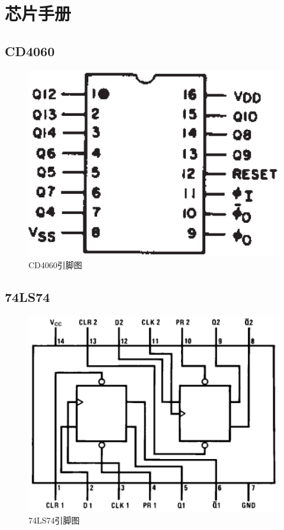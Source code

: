 \documentclass{article}
\newcounter{sub}
\begin{document}
\section{芯片手册}%
\label{sec:芯片手册}

\subsection{CD4060}%
\label{sub:CD4060}

\begin{figure}[H]
	\centering
	\includegraphics[width=0.6\linewidth]{CD4060.png}
	\caption{CD4060引脚图}
	\label{fig:CD4060引脚图}
\end{figure}

\newpage

\subsection{74LS74}%
\label{sub:74LS74}

\begin{figure}[H]
	\centering
	\includegraphics[width=0.6\linewidth]{74LS74.png}
	\caption{74LS74引脚图}
	\label{fig:74LS74引脚图}
\end{figure}
\end{document}
